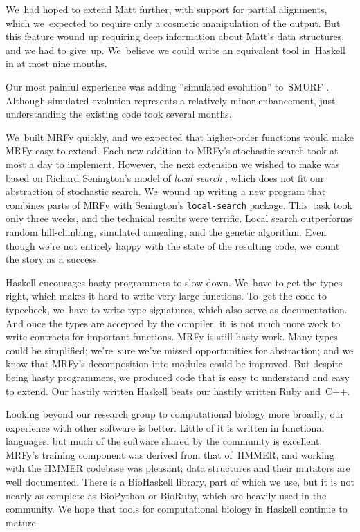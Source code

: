 \documentclass[]{jfp1}
\let\cite\citep
\begin{document}
We~had hoped to extend Matt further, with support for partial alignments,
which we~expected to require only 
a cosmetic manipulation of the 
output.
But
this feature wound up
requiring deep information about Matt's data structures,
and we had to give~up.
We~believe we could write an equivalent tool in~Haskell
in at most nine months.

Our most painful experience was adding ``simulated evolution''
to~SMURF \cite{Daniels:2012}. 
Although simulated evolution represents a relatively minor
enhancement,
just understanding the existing code took several months.

We~built MRFy quickly, and we expected that
higher-order functions would make MRFy easy to extend.
Each new addition to MRFy's stochastic search took at most a day
to implement.
However, the next extension we wished to make
was based on
Richard Senington's model of \emph{local
search} \cite{senington:combinators-local}, 
which does not fit our abstraction of stochastic search.
We~wound up writing a new program that combines parts
of MRFy with Senington's  \texttt{local-search} package.
This~task took only three weeks, and the technical results were terrific.
Local search outperforms random hill-climbing, simulated
annealing, and the genetic algorithm.
Even though we're not entirely happy with the
state of the resulting code, we~count the story as a success.




Haskell encourages hasty programmers to slow down.
We~have to get the types right,
which makes it hard to write very large functions.
To~get the code to typecheck, we~have to write type signatures, which
also serve as documentation.
And once the types are accepted by the compiler,
it~is not much more work to write contracts for important functions.
MRFy is still hasty work.
Many types could be simplified;
we're~sure we've missed opportunities for abstraction;
and we know that MRFy's decomposition into modules could be improved.
But despite being hasty programmers, we produced code 
that is easy to understand and easy to extend.
Our hastily written Haskell beats
our hastily written Ruby and~C++.


Looking beyond our research group to computational biology more
broadly, our experience with other software is better.
Little of it is written in functional languages, 
but much of the software shared by the community is excellent.
MRFy's training component was derived from that of~HMMER,
and
working with the HMMER 
codebase was pleasant;
data structures and their
mutators are well documented. 
There is a 
BioHaskell library, part of which we use,
but it is not nearly as 
complete as BioPython or BioRuby, which are heavily used in the community.
We hope that tools for computational biology in
Haskell continue to mature. 
\end{document}
